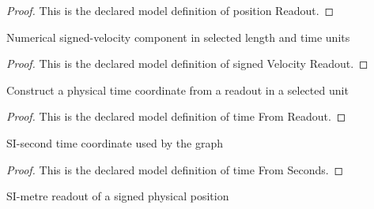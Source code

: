 \begin{proof}
  This is the declared model definition of position Readout.
\end{proof}
\begin{definition}
  \label{def:physics:phyx-mini-0671:phyxminiproblems-problemphyxmini0671-signedvelocityreadout}
  Numerical signed-velocity component in selected length and time units
\end{definition}
\begin{proof}
  This is the declared model definition of signed Velocity Readout.
\end{proof}
\begin{definition}
  \label{def:physics:phyx-mini-0671:phyxminiproblems-problemphyxmini0671-timefromreadout}
  Construct a physical time coordinate from a readout in a selected unit
\end{definition}
\begin{proof}
  This is the declared model definition of time From Readout.
\end{proof}
\begin{definition}
  \label{def:physics:phyx-mini-0671:phyxminiproblems-problemphyxmini0671-timefromseconds}
  SI-second time coordinate used by the graph
\end{definition}
\begin{proof}
  This is the declared model definition of time From Seconds.
\end{proof}
\begin{definition}
  \label{def:physics:phyx-mini-0671:phyxminiproblems-problemphyxmini0671-positioninmeters}
  SI-metre readout of a signed physical position
\end{definition}
